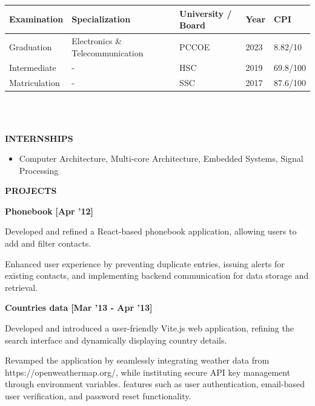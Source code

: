\documentclass[a4paper,10pt]{article}
\begin{document}
\vspace{-.8cm}

\begin{tabularx}{.98\textwidth}{llp{2cm}lll}
  \hline
  \textbf{Examination} & \textbf{Specialization}          &  & \textbf{University / Board} & \textbf{Year} & \textbf{CPI} \\
  \hline
  Graduation           & Electronics \& Telecommunication &  & PCCOE                       & 2023          & 8.82/10      \\
  Intermediate         & -                                &  & HSC                         & 2019          & 69.8/100     \\
  Matriculation        & -                                &  & SSC                         & 2017          & 87.6/100     \\
  \hline
\end{tabularx}
\\\\


\colorbox{titleColor}{\parbox{6.7in}{\textbf{INTERNSHIPS}}}
\begin{itemize}
  \setlength{\itemsep}{1pt}
  \item {{Computer Architecture, Multi-core Architecture, Embedded Systems, Signal Processing}}
\end{itemize}


\colorbox{titleColor}{\parbox{6.7in}{\textbf{ PROJECTS}}}


\begin{itemize*}
  \setlength{\itemsep}{1pt}
  \item \textbf{\small{Phonebook}} \hfill {\small{{\textbf{[Apr '12]}}}\/}
  \begin{itemize*}
    \item Developed and refined a React-based phonebook application, allowing users to add and filter contacts.
    \item Enhanced user experience by preventing duplicate entries, issuing alerts for existing contacts, and implementing backend communication for data storage and retrieval.
  \end{itemize*}
\end{itemize*}

\begin{itemize*}
  \setlength{\itemsep}{1pt}
  \item \textbf{\small{Countries data}} \hfill {\small{{\textbf{[Mar '13 - Apr '13]}}}\/}
  \begin{itemize*}
    \item Developed and introduced a user-friendly Vite.js web application, refining the search interface and dynamically displaying country details.
  \end{itemize*}
  \begin{itemize*}
    \item Revamped the application by seamlessly integrating weather data from https://openweathermap.org/, while instituting secure API key management through environment variables.
    features such as user authentication, email-based user verification, and password reset functionality.
  \end{itemize*}
\end{itemize*}
\end{document}
